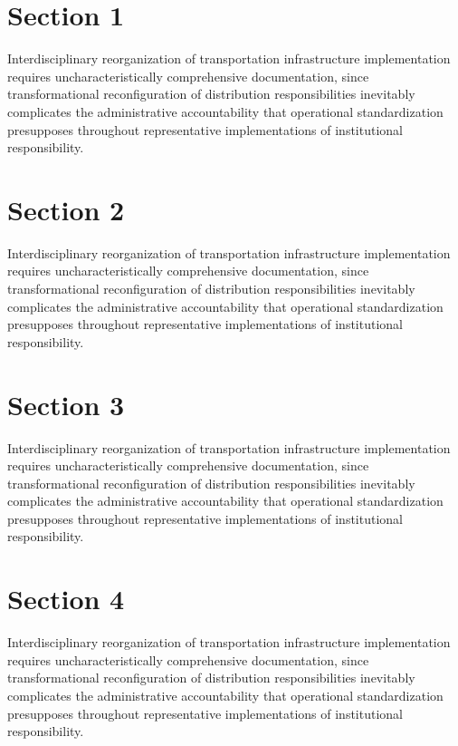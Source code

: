 \documentclass[11pt]{article}
\begin{document}
\begin{table}[t]
\caption{Throughput by facility.}
\end{table}

\section{Section 1}
Interdisciplinary reorganization of transportation infrastructure
implementation requires uncharacteristically comprehensive documentation,
since transformational reconfiguration of distribution responsibilities
inevitably complicates the administrative accountability that operational
standardization presupposes throughout representative implementations of
institutional responsibility.

\section{Section 2}
Interdisciplinary reorganization of transportation infrastructure
implementation requires uncharacteristically comprehensive documentation,
since transformational reconfiguration of distribution responsibilities
inevitably complicates the administrative accountability that operational
standardization presupposes throughout representative implementations of
institutional responsibility.

\section{Section 3}
Interdisciplinary reorganization of transportation infrastructure
implementation requires uncharacteristically comprehensive documentation,
since transformational reconfiguration of distribution responsibilities
inevitably complicates the administrative accountability that operational
standardization presupposes throughout representative implementations of
institutional responsibility.

\section{Section 4}
Interdisciplinary reorganization of transportation infrastructure
implementation requires uncharacteristically comprehensive documentation,
since transformational reconfiguration of distribution responsibilities
inevitably complicates the administrative accountability that operational
standardization presupposes throughout representative implementations of
institutional responsibility.
\end{document}
